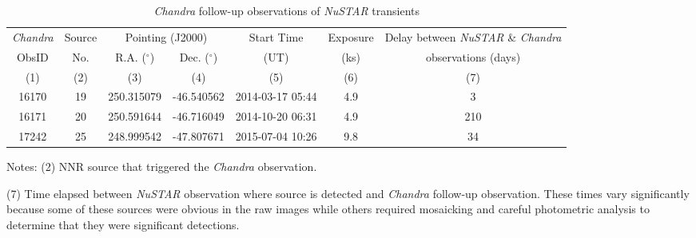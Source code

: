 \documentclass[iop,revtex4]{emulateapj}
\newcommand\T{\rule{0pt}{2.6ex}}       %
\newcommand\B{\rule[-1.2ex]{0pt}{0pt}} %
\begin{document}
\begin{table}
\begin{minipage}{\linewidth}
\centering
{\footnotesize
\begin{threeparttable}
\caption{\textit{Chandra} follow-up observations of \textit{NuSTAR} transients}
\begin{tabular}{ccccccc} \hline \hline
\T \textit{Chandra} & Source &\multicolumn{2}{c}{Pointing (J2000)} & Start Time & Exposure & Delay between \textit{NuSTAR} \& \textit{Chandra} \\
ObsID & No. & R.A. ($^{\circ}$) & Dec. ($^{\circ}$) & (UT) & (ks) & observations (days)\\
\B (1) & (2) & (3) & (4) & (5) & (6) & (7)  \\
\hline
\T 16170 & 19 & 250.315079 & -46.540562 & 2014-03-17 05:44 & 4.9 & 3 \\
16171 & 20 & 250.591644 & -46.716049 & 2014-10-20 06:31 & 4.9 & 210 \\
17242 & 25 & 248.999542 & -47.807671 & 2015-07-04 10:26 & 9.8 & 34 \\
\hline \hline
\end{tabular}
\begin{tablenotes}[flushleft]
\item Notes: (2) NNR source that triggered the \textit{Chandra} observation.  

\item (7) Time elapsed between \textit{NuSTAR} observation where source is detected and \textit{Chandra} follow-up observation.  These times vary significantly because some of these sources were obvious in the raw images while others required mosaicking and careful photometric analysis to determine that they were significant detections.  
\end{tablenotes}
\label{tab:chandra}
\end{threeparttable}}
\end{minipage}
\end{table}
\end{document}
